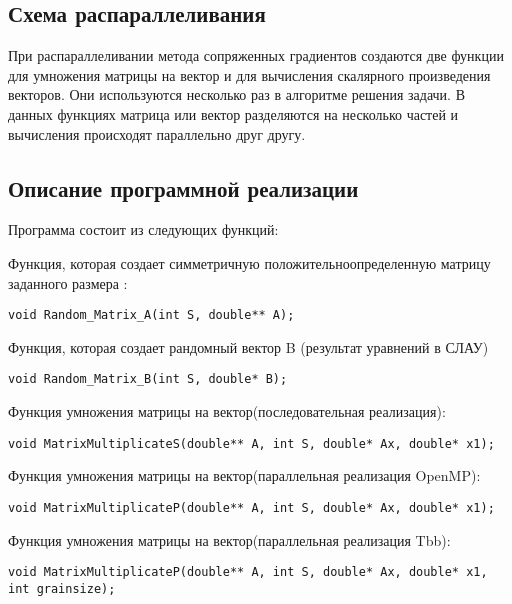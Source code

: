 \documentclass{report}
\begin{document}
\begin{center}
\section*{Схема распараллеливания}
\end{center}
При распараллеливании метода сопряженных градиентов создаются две функции для умножения матрицы на вектор и для вычисления скалярного произведения векторов. Они используются несколько раз в алгоритме решения задачи. В данных функциях матрица или вектор разделяются на несколько частей и вычисления происходят параллельно друг другу.
\newpage

\begin{center}
\section*{Описание программной реализации}
\end{center}
\par Программа состоит из следующих функций:
\par Функция, которая создает симметричную положительноопределенную матрицу заданного размера :
\begin{lstlisting}
void Random_Matrix_A(int S, double** A);
\end{lstlisting}
\par Функция, которая создает рандомный вектор B (результат уравнений в СЛАУ)
\begin{lstlisting}
void Random_Matrix_B(int S, double* B);
\end{lstlisting}
\par Функция умножения матрицы на вектор(последовательная реализация):
\begin{lstlisting}
void MatrixMultiplicateS(double** A, int S, double* Ax, double* x1);
\end{lstlisting}
\par Функция умножения матрицы на вектор(параллельная реализация OpenMP):
\begin{lstlisting}
void MatrixMultiplicateP(double** A, int S, double* Ax, double* x1);
\end{lstlisting}
\par Функция умножения матрицы на вектор(параллельная реализация Tbb):
\begin{lstlisting}
void MatrixMultiplicateP(double** A, int S, double* Ax, double* x1, int grainsize);
\end{lstlisting}
\end{document}
